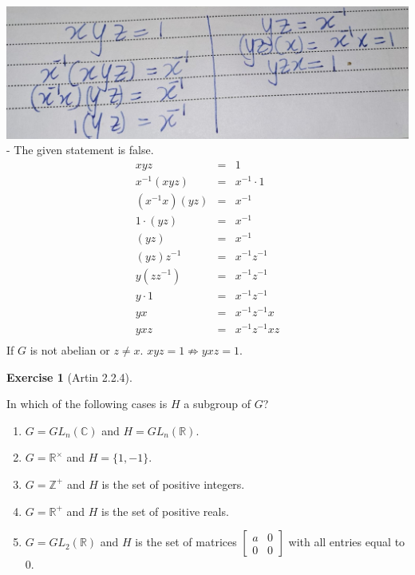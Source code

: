 \documentclass[
]{book}
\theoremstyle{definition}
\theoremstyle{definition}
\theoremstyle{definition}
\newtheorem{exercise}{Exercise}[chapter]
\theoremstyle{definition}
\theoremstyle{remark}
\begin{document}
\includegraphics{figures/ch_2/fig18.jpg}
- The given statement is false.
\begin{eqnarray}
          xyz&=&1\\
  x^{-1}(xyz)&=&x^{-1} \cdot 1\\
  (x^{-1}x)(yz)&=&x^{-1}\\
  1 \cdot(yz)&=&x^{-1}\\
  (yz)&=&x^{-1}\\
  (yz)z^{-1}&=&x^{-1}z^{-1}\\
  y(zz^{-1})&=&x^{-1}z^{-1}\\
  y \cdot 1&=&x^{-1}z^{-1}\\
  yx&=&x^{-1}z^{-1}x\\
  yxz&=&x^{-1}z^{-1}xz\\
\end{eqnarray}
If \(G\) is not abelian or \(z\neq x\). \(xyz=1 \nRightarrow yxz=1\).

\begin{exercise}[Artin 2.2.4]
\protect\hypertarget{exr:unnamed-chunk-87}{}\label{exr:unnamed-chunk-87}

In which of the following cases is \(H\) a subgroup of \(G\)?

\begin{enumerate}
\def\labelenumi{(\alph{enumi})}
\item
  \(G = GL_n(\mathbb{C})\) and \(H = GL_n(\mathbb{R})\).
\item
  \(G = \mathbb{R}^\times\) and \(H = \{1, -1\}\).
\item
  \(G = \mathbb{Z}^+\) and \(H\) is the set of positive integers.
\item
  \(G = \mathbb{R}^+\) and \(H\) is the set of positive reals.
\item
  \(G = GL_2(\mathbb{R})\) and \(H\) is the set of matrices \(\begin{bmatrix} a & 0 \\ 0 & 0 \end{bmatrix}\) with all entries equal to 0.
\end{enumerate}

\end{exercise}
\end{document}
